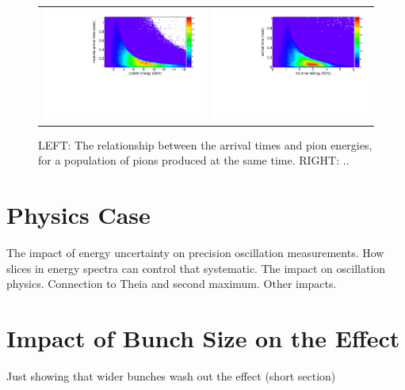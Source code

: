 \documentclass[preprint,12pt]{elsarticle}
\begin{document}
\begin{figure}[t]
	\begin{center}
           	\begin{tabular}{c c}	
           	\includegraphics[width=0.45 \linewidth]{Figures/14.10.18_LBNFtiming/parentEvsdT.pdf} &
			\includegraphics[width=0.45 \linewidth]{Figures/14.10.18_LBNFtiming/nuEvsdT.pdf} \\
			\end{tabular}
	\end{center}
	\caption{LEFT: The relationship between the arrival times and pion energies, for a population of pions produced at the same time. RIGHT: ..}
		\label{fig:anniedetector}
\end{figure}


\section{Physics Case}

The impact of energy uncertainty on precision oscillation measurements. How slices in energy spectra can control that systematic. The impact on oscillation physics. Connection to Theia and second maximum. Other impacts.


\section{Impact of Bunch Size on the Effect}

Just showing that wider bunches wash out the effect (short section)
\end{document}
